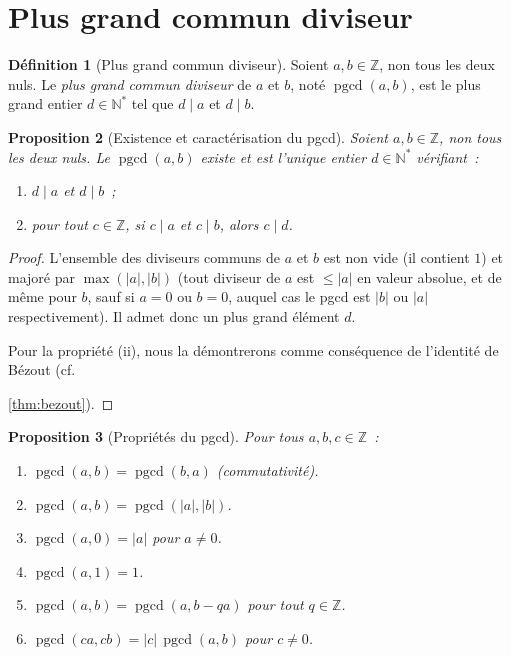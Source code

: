\documentclass[12pt,a4paper,openany]{book}
\theoremstyle{definition}
\newtheorem{definition}{Définition}[chapter]
\theoremstyle{plain}
\newtheorem{proposition}[definition]{Proposition}
\theoremstyle{remark}
\newcommand{\N}{\mathbb{N}}
\newcommand{\Z}{\mathbb{Z}}
\newcommand{\abs}[1]{\left|#1\right|}
\DeclareMathOperator{\pgcd}{pgcd}
\begin{document}
\section{Plus grand commun diviseur}
\label{sec:ch1:pgcd}


\begin{definition}[Plus grand commun diviseur]
\label{def:pgcd}
Soient $a, b \in \Z$, non tous les deux nuls. Le \emph{plus grand commun
diviseur} de $a$ et $b$, noté $\pgcd(a,b)$, est le plus grand entier
$d \in \N^*$ tel que $d \mid a$ et $d \mid b$.
\end{definition}

\begin{proposition}[Existence et caractérisation du pgcd]
\label{prop:pgcd:caract}
Soient $a, b \in \Z$, non tous les deux nuls. Le $\pgcd(a,b)$ existe et est l'unique
entier $d \in \N^*$ vérifiant~:
\begin{enumerate}[label=(\roman*)]
  \item $d \mid a$ et $d \mid b$~;
  \item pour tout $c \in \Z$, si $c \mid a$ et $c \mid b$, alors $c \mid d$.
\end{enumerate}
\end{proposition}

\begin{proof}
L'ensemble des diviseurs communs de $a$ et $b$ est non vide (il contient $1$) et
majoré par $\max(\abs{a}, \abs{b})$ (tout diviseur de $a$ est $\leq \abs{a}$ en
valeur absolue, et de même pour $b$, sauf si $a = 0$ ou $b = 0$, auquel cas le
pgcd est $\abs{b}$ ou $\abs{a}$ respectivement). Il admet donc un plus grand
élément $d$.

Pour la propriété (ii), nous la démontrerons comme conséquence de l'identité de
Bézout (cf.\ 





\ref{thm:bezout}).
\end{proof}

\begin{proposition}[Propriétés du pgcd]
\label{prop:pgcd:props}
Pour tous $a, b, c \in \Z$~:
\begin{enumerate}[label=(\roman*)]
  \item $\pgcd(a,b) = \pgcd(b,a)$ \textup{(commutativité)}.
  \item $\pgcd(a,b) = \pgcd(\abs{a}, \abs{b})$.
  \item $\pgcd(a, 0) = \abs{a}$ pour $a \neq 0$.
  \item $\pgcd(a, 1) = 1$.
  \item $\pgcd(a,b) = \pgcd(a, b - qa)$ pour tout $q \in \Z$.
  \item $\pgcd(ca, cb) = \abs{c}\, \pgcd(a,b)$ pour $c \neq 0$.
\end{enumerate}
\end{proposition}
\end{document}
